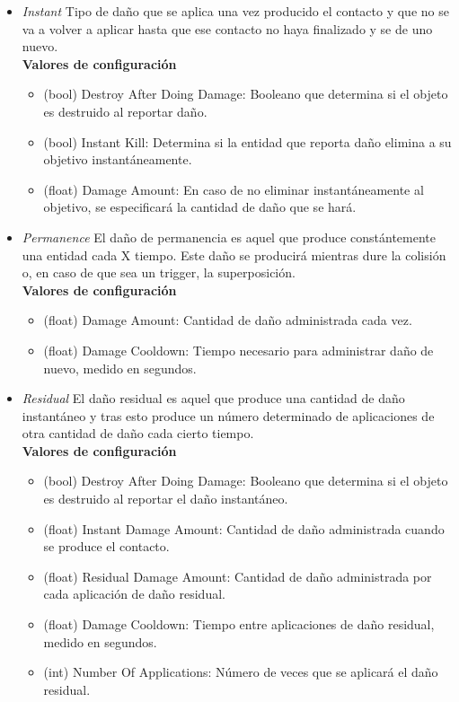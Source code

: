 \begin{itemize}
	\item \textit{Instant}
Tipo de daño que se aplica una vez producido el contacto y que no se va a volver a aplicar hasta que ese contacto no haya finalizado y se de uno nuevo.\\

\textbf{Valores de configuración}
	\begin{itemize}
	        \item (bool) Destroy After Doing Damage: Booleano que determina si el objeto es destruido al reportar daño.
	        \item (bool) Instant Kill: Determina si la entidad que reporta daño elimina a su objetivo instantáneamente.
	        \item (float) Damage Amount: En caso de no eliminar instantáneamente al objetivo, se especificará la cantidad de daño que se hará.
	 \end{itemize}
	\item \textit{Permanence}
El daño de permanencia es aquel que produce constántemente una entidad cada X tiempo. Este daño se producirá mientras dure la colisión o, en caso de que sea un trigger, la superposición.\\

\textbf{Valores de configuración}
	\begin{itemize}
	        \item (float) Damage Amount: Cantidad de daño administrada cada vez.
	        \item (float) Damage Cooldown: Tiempo necesario para administrar daño de nuevo, medido en segundos.
	\end{itemize}

	\item \textit{Residual}
El daño residual es aquel que produce una cantidad de daño instantáneo y tras esto produce un número determinado de aplicaciones de otra cantidad de daño cada cierto tiempo.\\

\textbf{Valores de configuración}
	\begin{itemize}
	        \item (bool) Destroy After Doing Damage: Booleano que determina si el objeto es destruido al reportar el daño instantáneo.
	        \item (float) Instant Damage Amount: Cantidad de daño administrada cuando se produce el contacto.
	        \item (float) Residual Damage Amount: Cantidad de daño administrada por cada aplicación de daño residual.
	        \item (float) Damage Cooldown: Tiempo entre aplicaciones de daño residual, medido en segundos.
	        \item (int) Number Of Applications: Número de veces que se aplicará el daño residual.
	\end{itemize}
\end{itemize}

